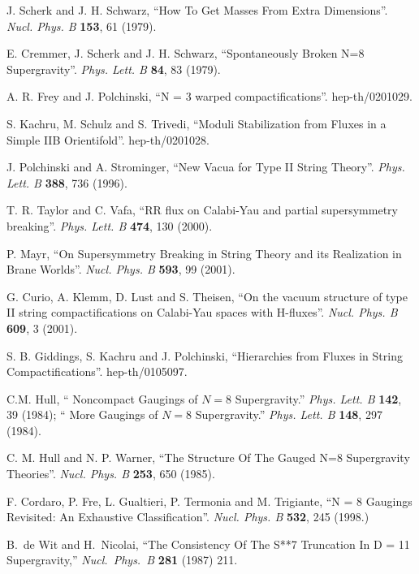 \documentclass[a4paper,12pt]{article}
\begin{document}
\begin{thebibliography}{99}
J. Scherk and J. H. Schwarz, ``How To Get Masses From Extra
Dimensions''. {\it Nucl. Phys. B} {\bf 153}, 61 (1979).

 E. Cremmer, J. Scherk and J. H. Schwarz,
 ``Spontaneously Broken N=8 Supergravity''.
{\it Phys. Lett. B} {\bf 84}, 83 (1979).



A. R. Frey and J. Polchinski, ``N = 3 warped compactifications''.
hep-th/0201029.



S. Kachru, M. Schulz and S. Trivedi,
 ``Moduli Stabilization from Fluxes in a Simple IIB Orientifold''.
 hep-th/0201028.

J. Polchinski and A. Strominger, ``New Vacua for Type II String
Theory''. {\it Phys.  Lett.  B} {\bf 388}, 736 (1996).



T. R. Taylor and C. Vafa, ``RR flux on Calabi-Yau and partial
supersymmetry breaking''. {\it Phys. Lett. B} {\bf 474}, 130
(2000).

P. Mayr, ``On Supersymmetry Breaking in String Theory and its
Realization in Brane Worlds''. {\it Nucl.  Phys.  B} {\bf 593}, 99
(2001).

G. Curio, A. Klemm, D. Lust and S. Theisen, ``On the vacuum
structure of type II string compactifications on  Calabi-Yau
spaces with H-fluxes''. {\it Nucl. Phys. B} {\bf 609}, 3 (2001).


 S. B. Giddings, S. Kachru and J. Polchinski,
``Hierarchies from Fluxes in String Compactifications''.
hep-th/0105097.


C.M. Hull, `` Noncompact Gaugings of $N=8$ Supergravity.'' {\it
Phys. Lett. B} {\bf 142}, 39 (1984); `` More Gaugings of $N=8$
Supergravity.'' {\it Phys. Lett. B} {\bf 148}, 297 (1984).


C. M. Hull and N. P. Warner, ``The Structure Of The Gauged N=8
Supergravity Theories''. {\it Nucl.  Phys. B} {\bf 253}, 650
(1985).




F. Cordaro, P. Fre, L. Gualtieri, P. Termonia and M. Trigiante,
``N = 8 Gaugings Revisited: An Exhaustive Classification''. {\it
Nucl. Phys. B } {\bf 532}, 245 (1998.)

B.~de Wit and H.~Nicolai,
``The Consistency Of The S**7 Truncation In D = 11 Supergravity,''
{\it Nucl.\ Phys.\ B} {\bf 281} (1987) 211.


\end{thebibliography}
\end{document}

